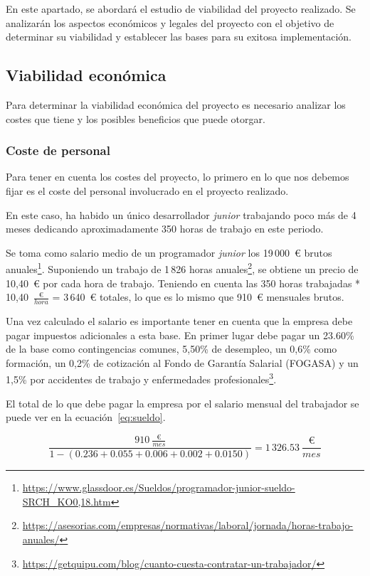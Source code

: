 En este apartado, se abordará el estudio de viabilidad del proyecto realizado.
Se analizarán los aspectos económicos y legales del proyecto con el objetivo de determinar su viabilidad y establecer las bases para su exitosa implementación.

\subsection{Viabilidad económica}
Para determinar la viabilidad económica del proyecto es necesario analizar los costes que tiene y los posibles beneficios que puede otorgar.

\subsubsection{Coste de personal}
Para tener en cuenta los costes del proyecto, lo primero en lo que nos debemos fijar es el coste del personal involucrado en el proyecto realizado.

En este caso, ha habido un único desarrollador \textit{junior} trabajando poco más de 4 meses dedicando aproximadamente 350 horas de trabajo en este periodo.

Se toma como salario medio de un programador \textit{junior} los 19\,000~€ brutos anuales\footnote{\url{https://www.glassdoor.es/Sueldos/programador-junior-sueldo-SRCH_KO0,18.htm}}.
Suponiendo un trabajo de 1\,826 horas anuales\footnote{\url{https://asesorias.com/empresas/normativas/laboral/jornada/horas-trabajo-anuales/}}, se obtiene un precio de 10,40~€ por cada hora de trabajo.
Teniendo en cuenta las 350 horas trabajadas * 10,40~$\frac{\text{€}}{hora}$ = 3\,640~€ totales, lo que es lo mismo que 910~€ mensuales brutos.

Una vez calculado el salario es importante tener en cuenta que la empresa debe pagar impuestos adicionales a esta base.
En primer lugar debe pagar un 23.60\% de la base como contingencias comunes, 5,50\% de desempleo, un 0,6\% como formación, un 0,2\% de cotización al Fondo de Garantía Salarial (FOGASA) y un 1,5\% por accidentes de trabajo y enfermedades profesionales\footnote{\url{https://getquipu.com/blog/cuanto-cuesta-contratar-un-trabajador/}}.

El total de lo que debe pagar la empresa por el salario mensual del trabajador se puede ver en la ecuación~\ref{eq:sueldo}.

\begin{equation}\label{eq:sueldo}
\frac{910~\frac{\text{€}}{mes}}{1 - (0.236 + 0.055 + 0.006 + 0.002 + 0.0150)} = 1\,326.53~ \frac{\text{€}}{mes}
\end{equation}

